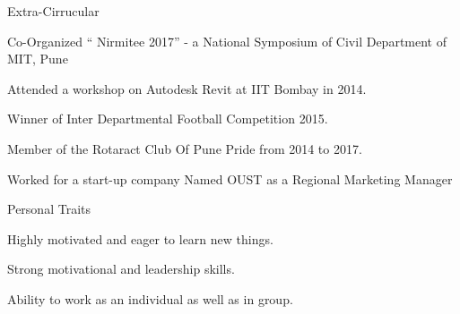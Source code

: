 \documentclass{resume} %
\begin{document}
\begin{rSection}{Extra-Cirrucular} \itemsep -3pt
\item Co-Organized “ Nirmitee 2017” - a National Symposium of Civil Department of MIT, Pune
\item Attended a workshop on Autodesk Revit at IIT Bombay in 2014.
\item Winner of Inter Departmental Football Competition 2015.
\item Member of the  Rotaract Club Of Pune Pride from 2014 to 2017.
\item Worked for a start-up company Named OUST as a Regional Marketing Manager

\end{rSection}

\begin{rSection}{Personal Traits}
\item Highly motivated and eager to learn new things.
\item Strong motivational and leadership skills.
\item Ability to work as an individual as well as in group.
\end{rSection}
\fi
\end{document}
